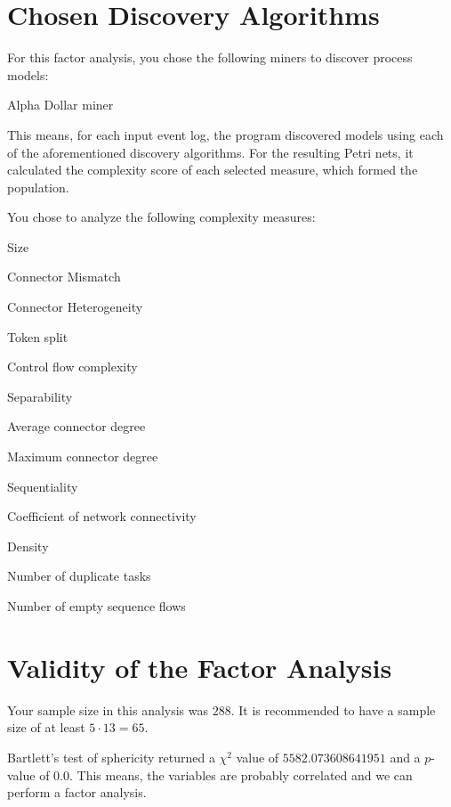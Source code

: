\documentclass[a4paper]{article}
\begin{document}
\section*{Chosen Discovery Algorithms}
For this factor analysis, you chose the following miners to discover process models:
\begin{compactitem}
\item Alpha Dollar miner
\end{compactitem}

This means, for each input event log, the program discovered models using each of the aforementioned discovery algorithms.
For the resulting Petri nets, it calculated the complexity score of each selected measure, which formed the population.

You chose to analyze the following complexity measures:
\begin{compactitem}
\item Size
\item Connector Mismatch
\item Connector Heterogeneity
\item Token split
\item Control flow complexity
\item Separability
\item Average connector degree
\item Maximum connector degree
\item Sequentiality
\item Coefficient of network connectivity
\item Density
\item Number of duplicate tasks
\item Number of empty sequence flows
\end{compactitem}

\section*{Validity of the Factor Analysis}
Your sample size in this analysis was $288$.
It is recommended to have a sample size of at least $5 \cdot 13 = 65$.

Bartlett's test of sphericity returned a $\chi^2$ value of $5582.073608641951$ and a $p$-value of $0.0$.
This means, the variables are probably correlated and we can perform a factor analysis.
\end{document}
